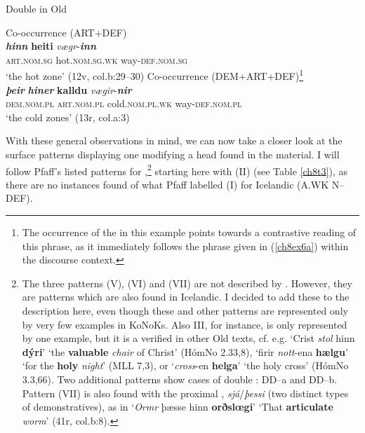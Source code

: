 \documentclass[output=paper,colorlinks,citecolor=brown]{langscibook}
\begin{document}
\begin{exe}
\ex\label{ch8ex6}Double  in Old \begin{xlist}
\ex\label{ch8ex6a} Co-occurrence (ART+DEF)\\
\gll \textit{\textbf{hinn}} \textbf{heiti} \textit{vægr}-\textit{\textbf{inn}} \\
\textsc{art.nom.sg} hot.\textsc{nom.sg.wk} way-\textsc{def.nom.sg}\\
\glt `the hot zone' (12v, col.b:29--30)
\ex\label{ch8ex6b}Co-occurrence (DEM+ART+DEF)\footnote{The
    occurrence of the  in this example points towards a
    contrastive reading of this phrase, as it immediately follows the
    phrase given in (\ref{ch8ex6a}) within the discourse context.} \\
\gll \textit{\textbf{þeir}} \textbf{\textit{hiner}} \textbf{kalldu} \textit{vægir}-\textbf{\textit{nir}} \\
 \textsc{dem.nom.pl} \textsc{art.nom.pl} cold.\textsc{nom.pl.wk} way-\textsc{def.nom.pl}\\
\glt `the cold zones' (13r, col.a:3)
\end{xlist}
\end{exe}

With these general observations in mind, we can now take a closer look
at the surface patterns displaying one  modifying a head 
found in the  material. I will follow Pfaff's \citeyearpar{Pfaff2019} listed
patterns for ,\footnote{The three patterns (V), (VI) and (VII) are
  not described by \citet{Pfaff2019}. However, they are patterns which are also found in Icelandic.
  I decided to add these to the description here, even though these and other patterns are represented only by very few examples in KoNoKs. Also 
  III, for instance, is only represented by one example, but it is a
  verified  in other Old  texts, cf. e.g. `Crist
  \textit{stol} hinn \textbf{dýri}'  `the \textbf{valuable} \textit{chair} of Christ' (HómNo 2.33,8), `firir \textit{nott}-ena \textbf{hælgu}' `for the \textbf{holy} \textit{night}' (MLL 7,3), or
  `\textit{cross}-en \textbf{helga}' `the holy cross' (HómNo 3.3,66). Two additional patterns show cases of double
  : DD--a and DD--b. Pattern (VII) is also found with the
  proximal , \textit{sjá}/\textit{þessi} (two distinct types of
  demonstratives), as in `\textit{Ormr} þæsse hinn \textbf{orðslœgi}' `That \textbf{articulate} \textit{worm}' (41r, col.b:8).} starting here with
 (II) (see Table \ref{ch8t3}), as there are no instances found of what Pfaff labelled
 (I) for Icelandic (A.WK N--DEF). 
\end{document}
